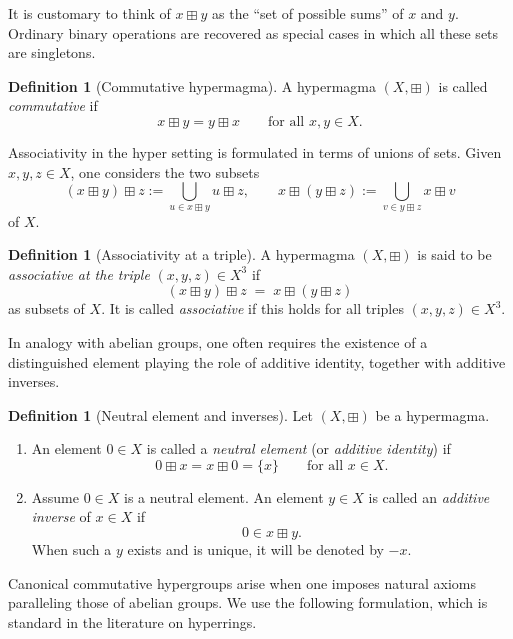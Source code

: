 \documentclass[11pt]{amsart}
\numberwithin{equation}{section}
\theoremstyle{definition}
\newtheorem{definition}[theorem]{Definition}
\theoremstyle{remark}
\begin{document}
It is customary to think of $x\boxplus y$ as the ``set of possible
sums'' of $x$ and $y$.  Ordinary binary operations are recovered as
special cases in which all these sets are singletons.

\begin{definition}[Commutative hypermagma]\label{def:comm-hypermagma}
A hypermagma $(X,\boxplus)$ is called \emph{commutative} if
\[
  x\boxplus y = y\boxplus x
  \qquad\text{for all }x,y\in X.
\]
\end{definition}

Associativity in the hyper setting is formulated in terms of unions of
sets.  Given $x,y,z\in X$, one considers the two subsets
\[
  (x\boxplus y)\boxplus z
  := \bigcup_{u\in x\boxplus y} u\boxplus z, \qquad
  x\boxplus(y\boxplus z)
  := \bigcup_{v\in y\boxplus z} x\boxplus v
\]
of $X$.

\begin{definition}[Associativity at a triple]\label{def:assoc-hyper}
A hypermagma $(X,\boxplus)$ is said to be \emph{associative at the
triple} $(x,y,z)\in X^3$ if
\[
  (x\boxplus y)\boxplus z
  \;=\; x\boxplus(y\boxplus z)
\]
as subsets of $X$.  It is called \emph{associative} if this holds for
all triples $(x,y,z)\in X^3$.
\end{definition}

In analogy with abelian groups, one often requires the existence of a
distinguished element playing the role of additive identity, together
with additive inverses.

\begin{definition}[Neutral element and inverses]\label{def:neutral-inverse}
Let $(X,\boxplus)$ be a hypermagma.
\begin{enumerate}
  \item An element $0\in X$ is called a \emph{neutral element} (or
        \emph{additive identity}) if
  \[
    0\boxplus x = x\boxplus 0 = \{x\}
    \qquad\text{for all }x\in X.
  \]
  \item Assume $0\in X$ is a neutral element.  An element $y\in X$ is
        called an \emph{additive inverse} of $x\in X$ if
  \[
    0 \in x\boxplus y.
  \]
  When such a $y$ exists and is unique, it will be denoted by $-x$.
\end{enumerate}
\end{definition}

Canonical commutative hypergroups arise when one imposes natural
axioms paralleling those of abelian groups.  We use the following
formulation, which is standard in the literature on hyperrings.
\end{document}
